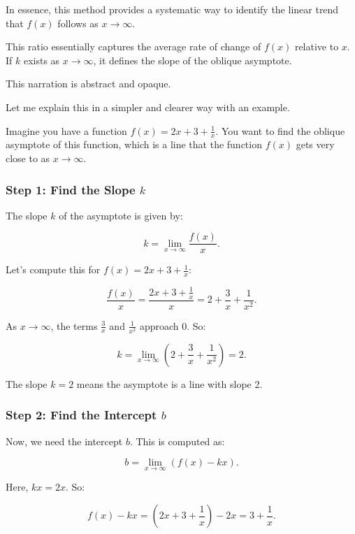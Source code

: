 \documentclass[a4paper,12pt]{article}
\begin{document}
In essence, this method provides a systematic way to identify the linear trend that \( f(x) \) follows as \( x \to \infty \).

\begin{qbox}
This ratio essentially captures the average rate of change of \( f(x) \) relative to \( x \). If \( k \) exists as \( x \to \infty \), it defines the slope of the oblique asymptote.

This narration is abstract and opaque.
\end{qbox}

Let me explain this in a simpler and clearer way with an example.

Imagine you have a function \( f(x) = 2x + 3 + \frac{1}{x} \). You want to find the oblique asymptote of this function, which is a line that the function \( f(x) \) gets very close to as \( x \to \infty \).

\hrulefill

\subsubsection{Step 1: Find the Slope \( k \)}

The slope \( k \) of the asymptote is given by:

\[
k = \lim_{x \to \infty} \frac{f(x)}{x}.
\]

Let’s compute this for \( f(x) = 2x + 3 + \frac{1}{x} \):

\[
\frac{f(x)}{x} = \frac{2x + 3 + \frac{1}{x}}{x} = 2 + \frac{3}{x} + \frac{1}{x^2}.
\]

As \( x \to \infty \), the terms \( \frac{3}{x} \) and \( \frac{1}{x^2} \) approach 0. So:

\[
k = \lim_{x \to \infty} \left(2 + \frac{3}{x} + \frac{1}{x^2}\right) = 2.
\]

The slope \( k = 2 \) means the asymptote is a line with slope 2.

\hrulefill

\subsubsection{Step 2: Find the Intercept \( b \)}

Now, we need the intercept \( b \). This is computed as:

\[
b = \lim_{x \to \infty} \left(f(x) - kx\right).
\]

Here, \( kx = 2x \). So:

\[
f(x) - kx = (2x + 3 + \frac{1}{x}) - 2x = 3 + \frac{1}{x}.
\]
\end{document}
